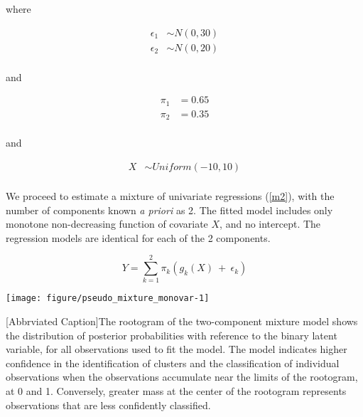 \documentclass[fleqn,10pt]{olplainarticle}\usepackage[]{graphicx}\usepackage[]{color}
\makeatletter
\def\maxwidth{ %
  \ifdim\Gin@nat@width>\linewidth
    \linewidth
  \else
    \Gin@nat@width
  \fi
}
\newenvironment{knitrout}{}{} %
\makeatother
\begin{document}
where 

\begin{align*}
  \epsilon_1 &\sim N(0,30) \\
  \epsilon_2 &\sim N(0,20) \\
\end{align*}

and

\begin{align*}
  \pi_1 &= 0.65 \\
  \pi_2 &= 0.35 \\
\end{align*}

and

\begin{align*}
  X &\sim Uniform(-10,10) \\
\end{align*}


We proceed to estimate a mixture of univariate regressions (\ref{m2}), with the number of components known \emph{a priori} as 2. The fitted model includes only monotone non-decreasing function of covariate $X$, and no intercept. The regression models are identical for each of the 2 components.

\begin{equation} \label{m2}
  Y = \sum_{k=1}^{2}\pi_k (g_{k} (X) \ +\  \epsilon_k)
\end{equation}

\begin{minipage}{0.8\textwidth}
\begin{knitrout}
\color{fgcolor}

{\centering \texttt{[image: figure/pseudo\_mixture\_monovar-1]} 

}



\end{knitrout}
[Abbrviated Caption]{The rootogram of the two-component mixture model shows the distribution of posterior probabilities with reference to the binary latent variable, for all observations used to fit the model. The model indicates higher confidence in the identification of clusters and the classification of individual observations when the observations accumulate near the limits of the rootogram, at 0 and 1. Conversely, greater mass at the center of the rootogram represents observations that are less confidently classified.}
\end{minipage}
\end{document}
